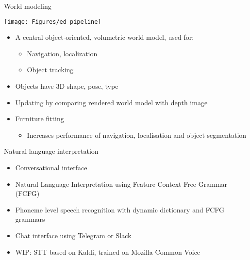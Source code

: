 \documentclass[12pt,a4paper]{article}
\newcommand{\emptylogo}{\texttt{[image: Figures/Empty]}}
\begin{document}
\begin{slidetop}
\begin{multicols}{2}
\begin{bclogo}[couleur = white, arrondi = 0.25, couleurBord = tuedarkblue , barre = none, logo=\emptylogo]{\textcolor{tuedarkblue}{World modeling}}
\medskip %
\begin{minipage}[T]{\textwidth}
    \begin{center}
        \texttt{[image: Figures/ed\_pipeline]}
    \end{center}
\end{minipage}
\begin{itemize}[topsep=0pt, itemsep = 0pt, parsep = 0pt, leftmargin=15pt]
	\item A central object-oriented, volumetric world model, used for:
	\begin{itemize}[topsep=0pt, itemsep = 0pt, parsep = 0pt, leftmargin=15pt]
		\item Navigation, localization
		\item Object tracking
	\end{itemize}
	\item Objects have 3D shape, pose, type
	\item Updating by comparing rendered world model with depth image
    \item Furniture fitting
    \begin{itemize}[topsep=0pt, itemsep = 0pt, parsep = 0pt, leftmargin=15pt]
		\item Increases performance of navigation, localisation and object segmentation
	\end{itemize}


\end{itemize}
\end{bclogo}

\vspace{-0.5cm} %

\begin{bclogo}[couleur = white, arrondi = 0.25, couleurBord = tuedarkblue, barre = none, logo=\emptylogo]{\textcolor{tuedarkblue}{Natural language interpretation}}
\medskip %
\begin{itemize}[topsep=0pt, itemsep = 0pt, parsep = 0pt, leftmargin=15pt]
	\item Conversational interface
	\item Natural Language Interpretation using Feature Context Free Grammar (FCFG)
	\item Phoneme level speech recognition with dynamic dictionary and FCFG grammars
	\item Chat interface using Telegram or Slack
	\item WIP: STT based on Kaldi, trained on Mozilla Common Voice
\end{itemize}
\end{bclogo}


\end{multicols}
\end{slidetop}
\end{document}
